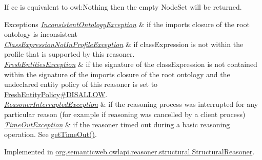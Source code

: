 If {\ttfamily ce} is equivalent to {\ttfamily owl\-:Nothing} then the empty {\ttfamily Node\-Set} will be returned.


\begin{DoxyExceptions}{Exceptions}
{\em \hyperlink{classorg_1_1semanticweb_1_1owlapi_1_1reasoner_1_1_inconsistent_ontology_exception}{Inconsistent\-Ontology\-Exception}} & if the imports closure of the root ontology is inconsistent \\
\hline
{\em \hyperlink{classorg_1_1semanticweb_1_1owlapi_1_1reasoner_1_1_class_expression_not_in_profile_exception}{Class\-Expression\-Not\-In\-Profile\-Exception}} & if {\ttfamily class\-Expression} is not within the profile that is supported by this reasoner. \\
\hline
{\em \hyperlink{classorg_1_1semanticweb_1_1owlapi_1_1reasoner_1_1_fresh_entities_exception}{Fresh\-Entities\-Exception}} & if the signature of the class\-Expression is not contained within the signature of the imports closure of the root ontology and the undeclared entity policy of this reasoner is set to \hyperlink{enumorg_1_1semanticweb_1_1owlapi_1_1reasoner_1_1_fresh_entity_policy_a762eae6d5b2449d125311ecaabfdc8d0}{Fresh\-Entity\-Policy\#\-D\-I\-S\-A\-L\-L\-O\-W}. \\
\hline
{\em \hyperlink{classorg_1_1semanticweb_1_1owlapi_1_1reasoner_1_1_reasoner_interrupted_exception}{Reasoner\-Interrupted\-Exception}} & if the reasoning process was interrupted for any particular reason (for example if reasoning was cancelled by a client process) \\
\hline
{\em \hyperlink{classorg_1_1semanticweb_1_1owlapi_1_1reasoner_1_1_time_out_exception}{Time\-Out\-Exception}} & if the reasoner timed out during a basic reasoning operation. See \hyperlink{interfaceorg_1_1semanticweb_1_1owlapi_1_1reasoner_1_1_o_w_l_reasoner_a44b2c968f989afe5290db29c90faa164}{get\-Time\-Out()}. \\
\hline
\end{DoxyExceptions}


Implemented in \hyperlink{classorg_1_1semanticweb_1_1owlapi_1_1reasoner_1_1structural_1_1_structural_reasoner_a230ccc3777750b198e19af80dbb2ab97}{org.\-semanticweb.\-owlapi.\-reasoner.\-structural.\-Structural\-Reasoner}.

